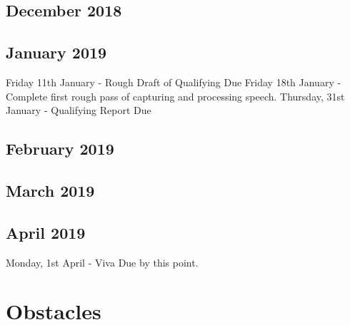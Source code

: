 \documentclass[a4paper]{article}
\begin{document}
	\subsection{December 2018}	
	
	\subsection{January 2019}
	Friday 11th January - Rough Draft of Qualifying Due
	Friday 18th January - Complete first rough pass of capturing and processing speech.
	Thursday, 31st January - Qualifying Report Due
	
	\subsection{February 2019}

	
	\subsection{March 2019}
	
	\subsection{April 2019}
	Monday, 1st April - Viva Due by this point.
\section{Obstacles}
\end{document}
